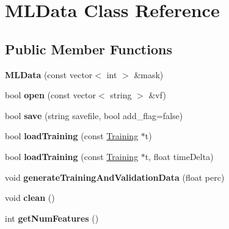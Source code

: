 \hypertarget{class_m_l_data}{\section{M\-L\-Data Class Reference}
\label{class_m_l_data}
}
\subsection*{Public Member Functions}
\begin{DoxyCompactItemize}
\item 
\hypertarget{class_m_l_data_abada8d81c2ec3c2cc7a2255dc7ea9a37}{{\bfseries M\-L\-Data} (const vector$<$ int $>$ \&mask)}\label{class_m_l_data_abada8d81c2ec3c2cc7a2255dc7ea9a37}

\item 
\hypertarget{class_m_l_data_a98dfa7ff0fa801bd27a1ef6c9bae5a4e}{bool {\bfseries open} (const vector$<$ string $>$ \&vf)}\label{class_m_l_data_a98dfa7ff0fa801bd27a1ef6c9bae5a4e}

\item 
\hypertarget{class_m_l_data_a6710827f90f4792c7cce2045fa62dc8a}{bool {\bfseries save} (string savefile, bool add\-\_\-flag=false)}\label{class_m_l_data_a6710827f90f4792c7cce2045fa62dc8a}

\item 
\hypertarget{class_m_l_data_a141c2774c2f40940083faaeff226875f}{bool {\bfseries load\-Training} (const \hyperlink{class_training}{Training} $\ast$t)}\label{class_m_l_data_a141c2774c2f40940083faaeff226875f}

\item 
\hypertarget{class_m_l_data_a1107ca6cb68a53bd757ae805877f5e23}{bool {\bfseries load\-Training} (const \hyperlink{class_training}{Training} $\ast$t, float time\-Delta)}\label{class_m_l_data_a1107ca6cb68a53bd757ae805877f5e23}

\item 
\hypertarget{class_m_l_data_a78eda93fdf296f99d61232fa5b706399}{void {\bfseries generate\-Training\-And\-Validation\-Data} (float perc)}\label{class_m_l_data_a78eda93fdf296f99d61232fa5b706399}

\item 
\hypertarget{class_m_l_data_a364682eec986213f575f80c9192df0e7}{void {\bfseries clean} ()}\label{class_m_l_data_a364682eec986213f575f80c9192df0e7}

\item 
\hypertarget{class_m_l_data_a597490a96a4e97829edd2ee659e2ffcf}{int {\bfseries get\-Num\-Features} ()}\label{class_m_l_data_a597490a96a4e97829edd2ee659e2ffcf}


\end{DoxyCompactItemize}
